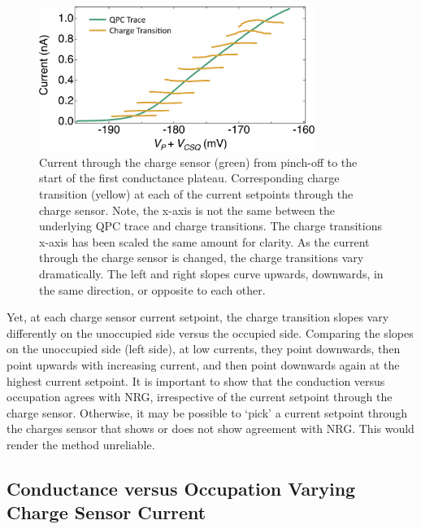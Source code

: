 \begin{figure}[!bht]
 \begin{center}
 \includegraphics[width=0.8\textwidth]{figures/ch3/crop_FiguresMaster.016.png}
 \caption[Charge transitions measured at various current setpoints through the charge sensor]{\label{fig:ch3/cond_occ_ct_set-points} 
 Current through the charge sensor (green) from pinch-off to the start of the first conductance plateau. Corresponding charge transition (yellow) at each of the current setpoints through the charge sensor. Note, the x-axis is not the same between the underlying QPC trace and charge transitions. The charge transitions x-axis has been scaled the same amount for clarity. As the current through the charge sensor is changed, the charge transitions vary dramatically. The left and right slopes curve upwards, downwards, in the same direction, or opposite to each other.}
 \end{center}
\end{figure}
\FloatBarrier

Yet, at each charge sensor current setpoint, the charge transition slopes vary differently on the unoccupied side versus the occupied side. Comparing the slopes on the unoccupied side (left side), at low currents, they point downwards, then point upwards with increasing current, and then point downwards again at the highest current setpoint. It is important to show that the conduction versus occupation agrees with NRG, irrespective of the current setpoint through the charge sensor. Otherwise, it may be possible to `pick' a current setpoint through the charges sensor that shows or does not show agreement with NRG. This would render the method unreliable. 




\subsection{Conductance versus Occupation Varying Charge Sensor Current}



